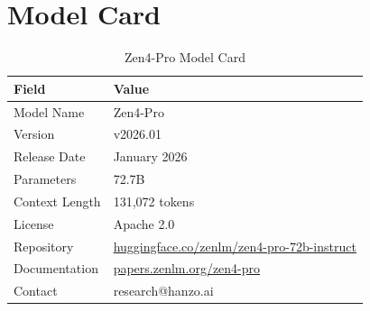 \documentclass[11pt,a4paper]{article}
\begin{document}
\appendix

\section{Model Card}

\begin{table}[H]
\centering
\begin{tabular}{ll}
\toprule
\textbf{Field} & \textbf{Value} \\
\midrule
Model Name      & Zen4-Pro \\
Version         & v2026.01 \\
Release Date    & January 2026 \\
Parameters      & 72.7B \\
Context Length  & 131,072 tokens \\
License         & Apache 2.0 \\
Repository      & \href{https://huggingface.co/zenlm/zen4-pro-72b-instruct}{huggingface.co/zenlm/zen4-pro-72b-instruct} \\
Documentation   & \href{https://papers.zenlm.org/zen4-pro}{papers.zenlm.org/zen4-pro} \\
Contact         & research@hanzo.ai \\
\bottomrule
\end{tabular}
\caption{Zen4-Pro Model Card}
\end{table}
\end{document}

